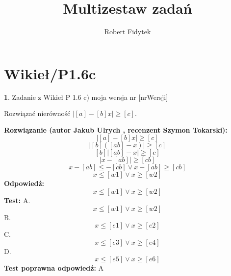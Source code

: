 \documentclass[12pt, a4paper]{article}
\title{Multizestaw zadań}
\author{Robert Fidytek}
\date{}
\theoremstyle{definition} %
\newtheorem{zad}{}
\newcommand{\kategoria}[1]{\section{#1}} %
\newcommand{\zadStart}[1]{\begin{zad}#1\newline} %
\newcommand{\zadStop}{\end{zad}}   %
\newcommand{\rozwStart}[2]{\noindent \textbf{Rozwiązanie (autor #1 , recenzent #2): }\newline} %
\newcommand{\rozwStop}{\newline}                                            %
\newcommand{\odpStart}{\noindent \textbf{Odpowiedź:}\newline}    %
\newcommand{\odpStop}{\newline}                                             %
\newcommand{\testStart}{\noindent \textbf{Test:}\newline} %
\newcommand{\testStop}{\newline} %
\newcommand{\kluczStart}{\noindent \textbf{Test poprawna odpowiedź:}\newline} %
\newcommand{\kluczStop}{\newline} %
\begin{document}
\maketitle


\kategoria{Wikieł/P1.6c}
\zadStart{Zadanie z Wikieł P 1.6 c) moja wersja nr [nrWersji]}

Rozwiązać nierówność $|[a]-[b]x|\geq[c]$.
\zadStop
\rozwStart{Jakub Ulrych}{Szymon Tokarski}
$$|[a]-[b]x|\geq[c]$$ 
$$|[b]([ab]-x)|\geq[c]$$
$$[b]|[ab]-x|\geq[c]$$
$$|x-[ab]|\geq[cb]$$
$$x-[ab]\leq-[cb]\vee x-[ab]\geq[cb]$$
$$x\leq [w1]\vee x\geq [w2]$$
\rozwStop
\odpStart
$$x\leq [w1]\vee x\geq [w2]$$
\odpStop
\testStart
A.$$x\leq [w1]\vee x\geq [w2]$$
B.$$x\leq [e1]\vee x\geq [e2]$$
C.$$x\leq [e3]\vee x\geq [e4]$$
D.$$x\leq [e5]\vee x\geq [e6]$$
\testStop
\kluczStart
A
\kluczStop
\end{document}
